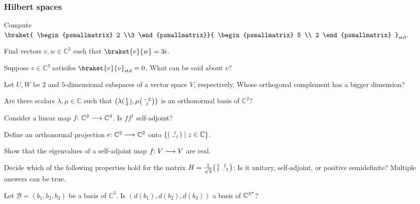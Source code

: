 \documentclass[a4paper, oneside, 12pt]{amsart}
\begin{document}
\subsubsection*{Hilbert spaces}
\begin{thmlist}
\item Compute \(\braket{
\begin{psmallmatrix}
2 \\3
\end{psmallmatrix}}{
\begin{psmallmatrix}
5 \\ 2
\end{psmallmatrix}
}_{\mathrm{std}}. \)
\item Find vectors \(v, w \in \mathbb{C}^{3}\) such that \(\braket{v}{w} = 3i\).
\item Suppose \(v\in \mathbb{C}^{3}\) satisifes \(\braket{v}{v}_{\mathrm{std}} = 0\).
What can be said about \(v\)?
\item Let \(U, W\) be \(2\) and \(5\)-dimensional subspaces of a vector space \(V\), respectively.
Whose orthogonal complement has a bigger dimension?
\item Are there scalars \(\lambda, \mu \in \mathbb{C}\) such that
\(\left(
  \lambda
  \begin{psmallmatrix}
    1 \\ 2
  \end{psmallmatrix},
  \mu
  \begin{psmallmatrix}
    -2 \\ 1
  \end{psmallmatrix}
\right)\)
is an orthonormal basis of \( \mathbb{C}^{2}\)?
\item Consider a linear map \(f \from \mathbb{C}^{2} \to \mathbb{C}^{3}\). Is \(ff^{\dagger}\) self-adjoint?
\item Define an orthonormal projection \(e \from \mathbb{C}^{2} \to \mathbb{C}^{2}\) onto
\(\left\{
  \begin{psmallmatrix}
    z \\ - z
  \end{psmallmatrix} \; \middle\vert\; z\in \mathbb{C}
\right\}\).
\item Show that the eigenvalues of a self-adjoint map \(f \from V \to V\) are real.
\item Decide which of the following properties hold for the matrix \(H=
\tfrac{1}{\sqrt{2}}
\begin{psmallmatrix}
  1 & 1 \\ 1 & -1
\end{psmallmatrix}
\):
Is it unitary, self-adjoint, or positive semidefinite? Multiple answers can be true.
\item Let \(\mathcal{B}=(b_{1}, b_{2}, b_{3})\) be a basis of \( \mathbb{C}^{3}\).
Is \((d(b_{1}), d(b_{2}), d(b_{3}))\) a basis of \(\rd*{ \mathbb{C}^{3}}\)?
\end{thmlist}
\end{document}
